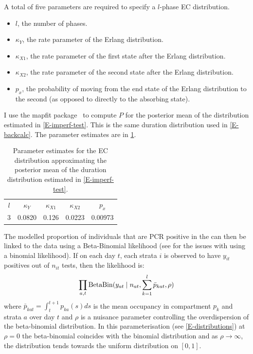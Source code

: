 \documentclass[thesis.tex]{subfiles}
\begin{document}
A total of five parameters are required to specify a $l$-phase EC distribution.
\begin{itemize}
    \item $l$, the number of phases.
    \item $\kappa_Y$, the rate parameter of the Erlang distribution.
    \item $\kappa_{X1}$, the rate parameter of the first state after the Erlang distribution.
    \item $\kappa_{X2}$, the rate parameter of the second state after the Erlang distribution.
    \item $p_x$, the probability of moving from the end state of the Erlang distribution to the second (as opposed to directly to the absorbing state).
\end{itemize}

I use the mapfit package~\autocite{mapfit} to compute $P$ for the posterior mean of the distribution estimated in \cref{E-imperf-test}.
This is the same duration distribution used in \cref{E-backcalc}.
The parameter estimates are in \cref{SEIR:table:ec-params}.
\begin{table}
    \centering
    \begin{tabular}{c c c c c}
        $l$ & $\kappa_Y$ & $\kappa_{X1}$ & $\kappa_{X2}$ & $p_x$ \\
        3 & 0.0820 & 0.126 & 0.0223 & 0.00973  \\
    \end{tabular}
    \caption{Parameter estimates for the EC distribution approximating the posterior mean of the duration distribution estimated in \cref{E-imperf-test}.}
    \label{SEIR:table:ec-params}
\end{table}

The modelled proportion of individuals that are PCR positive in the can then be linked to the data using a Beta-Binomial likelihood (see for the issues with using a binomial likelihood).
If on each day $t$, each strata $i$ is observed to have $y_{it}$ positives out of $n_{it}$ tests, then the likelihood is:
\begin{align}
    \prod_{a,t} \operatorname{BetaBin} (y_{at} \mid n_{at}, \sum_{k=1}^l \bar{p}_{kat}, \rho)
    \label{SEIR:eq:likelihood}
\end{align}
where $\bar{p}_{kat} = \int_{t}^{t+1} p_{ka}(s) ds$ is the mean occupancy in compartment $p_k$ and strata $a$ over day $t$ and $\rho$ is a nuisance parameter controlling the overdispersion of the beta-binomial distribution.
In this parameterisation (see \cref{E-distributions}) at $\rho=0$ the beta-binomial coincides with the binomial distribution and as $\rho \to \infty$, the distribution tends towards the uniform distribution on $[0, 1]$.
\end{document}
